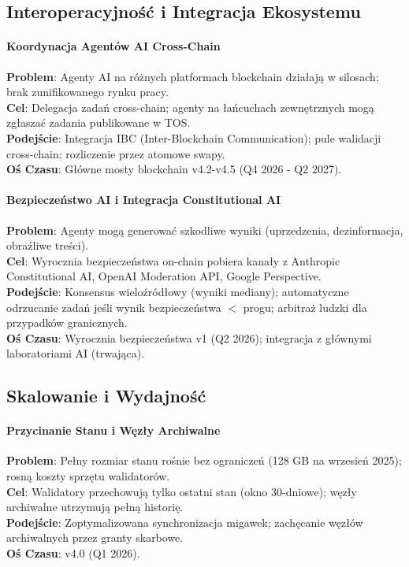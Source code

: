 \documentclass[11pt]{article}
\begin{document}
\subsection{Interoperacyjność i Integracja Ekosystemu}

\paragraph{Koordynacja Agentów AI Cross-Chain}
\textbf{Problem}: Agenty AI na różnych platformach blockchain działają w silosach; brak zunifikowanego rynku pracy.\\
\textbf{Cel}: Delegacja zadań cross-chain; agenty na łańcuchach zewnętrznych mogą zgłaszać zadania publikowane w TOS.\\
\textbf{Podejście}: Integracja IBC (Inter-Blockchain Communication); pule walidacji cross-chain; rozliczenie przez atomowe swapy.\\
\textbf{Oś Czasu}: Główne mosty blockchain v4.2-v4.5 (Q4 2026 - Q2 2027).

\paragraph{Bezpieczeństwo AI i Integracja Constitutional AI}
\textbf{Problem}: Agenty mogą generować szkodliwe wyniki (uprzedzenia, dezinformacja, obraźliwe treści).\\
\textbf{Cel}: Wyrocznia bezpieczeństwa on-chain pobiera kanały z Anthropic Constitutional AI, OpenAI Moderation API, Google Perspective.\\
\textbf{Podejście}: Konsensus wieloźródłowy (wyniki mediany); automatyczne odrzucanie zadań jeśli wynik bezpieczeństwa $<$ progu; arbitraż ludzki dla przypadków granicznych.\\
\textbf{Oś Czasu}: Wyrocznia bezpieczeństwa v1 (Q2 2026); integracja z głównymi laboratoriami AI (trwająca).

\subsection{Skalowanie i Wydajność}

\paragraph{Przycinanie Stanu i Węzły Archiwalne}
\textbf{Problem}: Pełny rozmiar stanu rośnie bez ograniczeń (128 GB na wrzesień 2025); rosną koszty sprzętu walidatorów.\\
\textbf{Cel}: Walidatory przechowują tylko ostatni stan (okno 30-dniowe); węzły archiwalne utrzymują pełną historię.\\
\textbf{Podejście}: Zoptymalizowana synchronizacja migawek; zachęcanie węzłów archiwalnych przez granty skarbowe.\\
\textbf{Oś Czasu}: v4.0 (Q1 2026).
\end{document}

